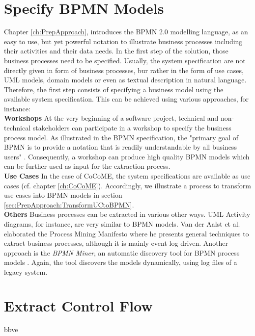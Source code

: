 \section{Specify BPMN Models}
\label{sec:Solution:SpecifyBPMN}
Chapter \ref{ch:PrepApproach}, introduces the BPMN 2.0 modelling language, as an easy to use, but yet powerful notation to illustrate business processes including their activities and their data needs.
In the first step of the solution, those business processes need to be specified. Usually, the system specification are not directly given in form of business processes, bur rather in the form of use cases, UML models, domain models or even as textual description in natural language. Therefore, the first step consists of specifying a business model using the available system specification. This can be achieved using various approaches, for instance: \\

\noindent
\textbf{Workshops} At the very beginning of a software project, technical and non-technical stakeholders can participate in a workshop to specify the business process model. As illustrated in the BPMN specification, the "primary goal of BPMN is to provide a notation that is readily understandable by all business users"  \cite{OMG}. Consequently, a workshop can produce high quality BPMN models which can be further used as input for the extraction process.\\

\noindent
\textbf{Use Cases} In the case of CoCoME, the system specifications are available as use cases (cf. chapter \ref{ch:CoCoME}). Accordingly, we illustrate a process to transform use cases into BPMN models in section \ref{sec:PrepApproach:TransformUCtoBPMN}. \\

\noindent
\textbf{Others} Business processes can be extracted in various other ways. UML Activity diagrams, for instance, are very similar to BPMN models. Van der Aalst et al. elaborated the Process Mining Manifesto \cite{ProcessMiningManifesto} where he presents general techniques to extract business processes, although it is mainly event log driven. Another approach is the \textit{BPMN Miner}, an automatic discovery tool for BPMN process models \cite{BPMNMiner}. Again, the tool discovers the models dynamically, using log files of a legacy system.



\section{Extract Control Flow}
\label{sec:Solution:ExtractControlFlow}
bbve



